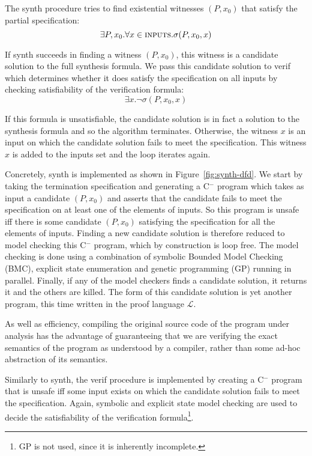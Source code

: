 \documentclass[preprint]{sigplanconf}
\theoremstyle{definition}
\newcommand{\newC}{C$^-$\xspace}
\begin{document}
The {\sc synth} procedure tries to find existential witnesses $(P, x_0)$
that satisfy the partial specification:
%
\[
 \exists P, x_0 . \forall x \in \text{\sc inputs} . \sigma(P, x_0, x)
\]

If {\sc synth} succeeds in finding a witness $(P, x_0)$, this witness is a
candidate solution to the full synthesis formula.  We pass this candidate
solution to {\sc verif} which determines whether it does satisfy
the specification on all inputs by checking satisfiability of the
verification formula:
%
\[
 \exists x . \lnot \sigma(P, x_0, x)
\]

If this formula is unsatisfiable, the candidate solution is in fact a
solution to the synthesis formula and so the algorithm terminates. 
Otherwise, the witness $x$ is an input on which the candidate solution fails
to meet the specification.  This witness $x$ is added to the {\sc inputs}
set and the loop iterates again.

Concretely, {\sc synth} is implemented as shown in
Figure~\ref{fig:synth-dfd}.  We start by taking the termination
specification and generating a \newC program which takes as input a candidate
$(P, x_0)$ and asserts that the candidate fails to meet the specification on
at least one of the elements of {\sc inputs}.  So this program is unsafe iff
there is some candidate $(P, x_0)$ satisfying the specification for all the
elements of {\sc inputs}.  Finding a new candidate solution is therefore
reduced to model checking this \newC program, which by construction is loop
free.  The model checking is done using a combination of symbolic Bounded Model
Checking (BMC), explicit state enumeration and genetic programming (GP) running in
parallel.
Finally, if any of the model checkers finds a candidate solution, it returns it
and the others are killed.  The form of
this candidate solution is yet another program, this time written in the
proof language $\mathcal{L}$.

As well as efficiency, compiling the original source code of the program
under analysis has the advantage of guaranteeing that we are verifying the
exact semantics of the program as understood by a compiler, rather than some
ad-hoc abstraction of its semantics.

Similarly to {\sc synth}, the {\sc verif} procedure is implemented by
creating a \newC program that is unsafe iff some input exists on which the
candidate solution fails to meet the specification.  Again, symbolic and
explicit state model checking are used to decide the satisfiability of the
verification formula\footnote{GP is not used, since it is inherently incomplete.}.
\end{document}
